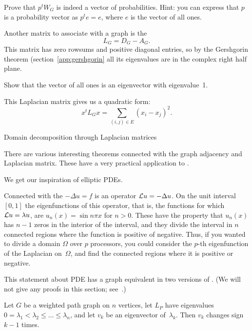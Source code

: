 \begin{exercise}
Prove that $p^tW_G$ is indeed a vector of probabilities. Hint: 
you can express that $p$ is a probability vector as $p^te=e$,
where $e$ is the vector of all ones.
\end{exercise}

Another matrix to associate with a graph is the
\[ L_G = D_G-A_G. \]
This matrix has zero rowsums and positive diagonal entries, so by the
Gershgorin theorem (section~\ref{app:gershgorin} all its eigenvalues
are in the complex right half plane. 

\begin{exercise}
  Show that the vector of all ones is an eigenvector with eigenvalue~1.
\end{exercise}

This Laplacian matrix gives us a quadratic form:
\[ x^tL_Gx = \sum_{(i,j)\in E} (x_i-x_j)^2. \]

 {Domain decomposition through Laplacian matrices}
\label{sec:fiedler-vector}

There are various interesting theorems connected with the graph
adjacency and Laplacian matrix. 
These have a very practical application to
.

We get our inspiration of elliptic \acp{PDE}.

Connected with the 
$-\Delta u=f$ is an operator ${\cal L}u=-\Delta u$. 
On the unit interval $[0,1]$ the eigenfunctions
of this operator, that is, the functions for which ${\cal L}u=\lambda u$,
are $u_n(x)=\sin n\pi x$ for $n>0$. These have the property that $u_n(x)$
has $n-1$ zeros in the interior of the interval, and they divide the interval
in $n$ connected regions where the function is positive of negative.
Thus, if you wanted to divide a domain $\Omega$ over $p$ processors, you could
consider the $p$-th eigenfunction of the Laplacian on~$\Omega$, and find
the connected regions where it is positive or negative.

This statement about \ac{PDE} has a graph equivalent in two versions
of . (We will not give any proofs
in this section;
see~\cite{Spielman:spectral-graph-theory}.)
\begin{theorem}
  Let $G$ be a weighted path graph on $n$ vertices, let $L_P$ have
  eigenvalues $0 = \lambda_1 < \lambda_2\leq\ldots\leq\lambda_n$, and let
  $v_k$ be an eigenvector of~$\lambda_k$. Then $v_k$ changes sign
  $k-1$ times.
\end{theorem}

